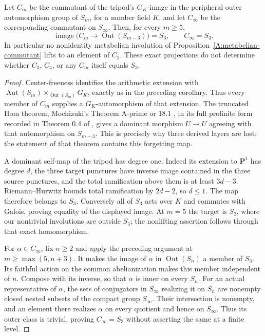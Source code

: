 \begin{proposition}
\label{A:solvable-projection-limit}
Let $C_m$ be the commutant of the tripod's $G_K$-image in
the peripheral outer automorphism group of $S_m$, for a
number field $K$, and let $C_\infty$ be the corresponding
commutant on $S_\infty$. Then, for every $m\ge5$,
\[
 \operatorname{image}\bigl(C_m\to\operatorname{Out}(S_{m-3})\bigr)
                   =S_3,
       \qquad C_\infty=S_3.
\]
In particular no nonidentity metabelian involution of
Proposition~\ref{A:metabelian-commutant} lifts to an element
of $C_5$. These exact projections do not determine whether
$C_3$, $C_4$, or any $C_m$ itself equals $S_3$.
\end{proposition}
\begin{proof}
Center-freeness identifies the arithmetic extension with
$\operatorname{Aut}(S_m)\times_{\operatorname{Out}(S_m)}G_K$,
exactly as in the preceding corollary. Thus every member of
$C_m$ supplies a $G_K$-automorphism of that extension.
The truncated Hom theorem, Mochizuki's Theorem A-prime or
18.1 \cite{A_Mochizuki1999}, in its full profinite form
recorded in Theorem 0.4 of \cite{A_Yamaguchi2024}, gives a
dominant morphism $U\to U$ agreeing with that automorphism
on $S_{m-3}$. This is precisely why three derived layers
are lost; the statement of that theorem contains this
forgetting map.

A dominant self-map of the tripod has degree one. Indeed
its extension to $\mathbf P^1$ has degree $d$, the three
target punctures have inverse image contained in the three
source punctures, and the total ramification above them
is at least $3d-3$. Riemann--Hurwitz bounds total
ramification by $2d-2$, so $d\le1$. The map therefore
belongs to $S_3$. Conversely all of $S_3$ acts over $K$
and commutes with Galois, proving equality of the displayed
image. At $m=5$ the target is $S_2$, where our nontrivial
involutions are outside $S_3$; the nonlifting assertion
follows through that exact homomorphism.

For $\alpha\in C_\infty$, fix $n\ge2$ and apply the
preceding argument at $m\ge\max(5,n+3)$. It makes the
image of $\alpha$ in $\operatorname{Out}(S_n)$ a member
of $S_3$. Its faithful action on the common abelianization
makes this member independent of $n$. Compose with its
inverse, so that $\alpha$ is inner on every $S_n$.
For an actual representative of $\alpha$, the sets of
conjugators in $S_\infty$ realizing it on $S_n$ are
nonempty closed nested subsets of the compact group
$S_\infty$. Their intersection is nonempty, and an element
there realizes $\alpha$ on every quotient and hence on
$S_\infty$. Thus its outer class is trivial, proving
$C_\infty=S_3$ without asserting the same at a finite
level.
\end{proof}

